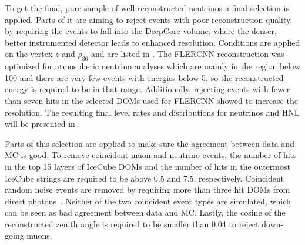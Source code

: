To get the final, pure sample of well reconstructed neutrinos a final selection is applied. Parts of it are aiming to reject events with poor reconstruction quality, by requiring the events to fall into the DeepCore volume, where the denser, better instrumented detector leads to enhanced resolution. Conditions are applied on the vertex $z$ and $\rho_{36}$ and are listed in . The FLERCNN reconstruction was optimized for atmospheric neutrino analyses which are mainly in the region below \SI{100}{\gev} and there are very few events with energies below \SI{5}{\gev}, so the reconstructed energy is required to be in that range. Additionally, rejecting events with fewer than seven hits in the selected DOMs used for FLERCNN showed to increase the resolution. The resulting final level rates and distributions for neutrinos and HNL will be presented in .

Parts of this selection are applied to make sure the agreement between data and MC is good. To remove coincident muon and neutrino events, the number of hits in the top 15 layers of IceCube DOMs and the number of hits in the outermost IceCube strings are required to be above 0.5 and 7.5, respectively. Coincident random noise events are removed by requiring more than three hit DOMs from direct photons~\cite{low_energy_reco_IC}. Neither of the two coincident event types are simulated, which can be seen as bad agreement between data and MC. Lastly, the cosine of the reconstructed zenith angle is required to be smaller than 0.04 to reject down-going muons.

